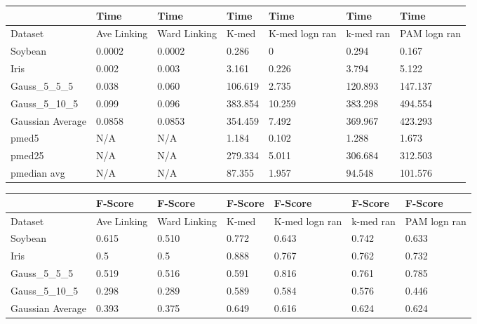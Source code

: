 \documentclass{article}
\begin{document}
\begin{figure*}[h]
\label{fig:hier_results}
\small
\begin{tabular}{ | l | l | l | l | l | l | l | }
\hline
	   & Time & Time & Time & Time & Time & Time \\ \hline
	Dataset & Ave Linking & Ward Linking & K-med & K-med logn ran & k-med ran & PAM logn ran \\ \hline
	Soybean & 0.0002 & 0.0002 & 0.286 & 0 & 0.294 & 0.167 \\ 
	Iris & 0.002 & 0.003 & 3.161 & 0.226 & 3.794 & 5.122 \\ 
	Gauss\_5\_5\_5 & 0.038 & 0.060 & 106.619 & 2.735 &120.893 & 147.137 \\
	Gauss\_5\_10\_5 & 0.099 & 0.096 & 383.854 & 10.259 & 383.298 & 494.554 \\
	Gaussian Average & 0.0858 & 0.0853 & 354.459 & 7.492 & 369.967 & 423.293 \\ 
	pmed5 &  N/A & N/A & 1.184 & 0.102 & 1.288 & 1.673   \\ 
	pmed25 & N/A & N/A & 279.334 & 5.011 & 306.684 & 312.503   \\ 
	pmedian avg & N/A & N/A &  87.355 & 1.957 & 94.548 & 101.576   \\ \hline
\end{tabular}
\vspace{0.2 cm}

\begin{tabular}{ | l | l | l | l | l | l | l | }
\hline
	   & F-Score & F-Score & F-Score & F-Score & F-Score & F-Score \\ \hline
	Dataset & Ave Linking & Ward Linking & K-med & K-med logn ran & k-med ran & PAM logn ran \\ \hline
	Soybean & 0.615 & 0.510 & 0.772 & 0.643 & 0.742 & 0.633 \\ 
	Iris & 0.5 & 0.5 & 0.888 & 0.767 & 0.762 & 0.732 \\ 
	Gauss\_5\_5\_5 & 0.519 & 0.516 & 0.591 & 0.816 & 0.761 & 0.785 \\
	Gauss\_5\_10\_5 & 0.298 & 0.289 & 0.589 & 0.584 & 0.576 & 0.446 \\
	Gaussian Average & 0.393 & 0.375 & 0.649 & 0.616 & 0.624 & 0.624 \\ \hline
\end{tabular}
\vspace{0.2 cm}


\end{figure*}
\end{document}
